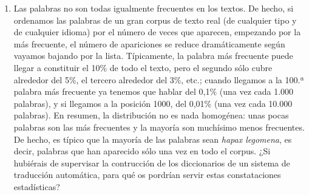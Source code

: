 \begin{enumerate}
\item Las palabras no son todas igualmente frecuentes en los textos. De hecho, si ordenamos las palabras de un gran corpus de texto real (de cualquier tipo y de cualquier idioma) por el número de veces que aparecen, empezando por la más frecuente, el número de apariciones se reduce dramáticamente según vayamos bajando por la lista. Típicamente, la palabra más frecuente puede llegar a constituir el 10\% de todo el texto, pero el segundo sólo cubre alrededor del 5\%, el tercero alrededor del 3\%, etc.; cuando llegamos a la 100.ª palabra más frecuente ya tenemos que hablar del 0,1\% (una vez cada 1.000 palabras), y si llegamos a la posición 1000, del 0,01\% (una vez cada 10.000 palabras). En resumen, la distribución no es nada homogénea: unas pocas palabras son las más frecuentes y la mayoría son muchísimo menos frecuentes. De hecho, es típico que la mayoría de las palabras sean \emph{hapax legomena}, es decir, palabras que han aparecido sólo una vez en todo el corpus. ¿Si hubiérais de supervisar la contrucción de los diccionarios de un sistema de traducción automática, para qué os pordrían servir estas constataciones estadísticas? 


\end{enumerate}

